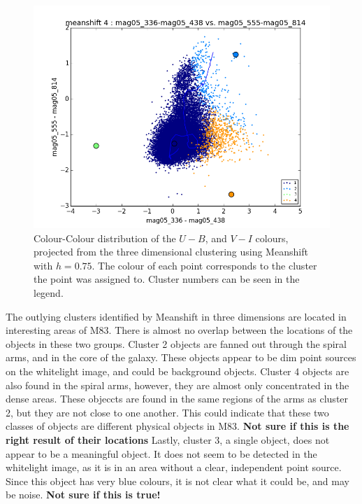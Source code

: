 \begin{figure}[H]
\centering
\includegraphics[width=\linewidth]{figs/broad/meanshift_base_color_4cl_mag05_336-mag05_438vsmag05_555-mag05_814}
\caption{Colour-Colour distribution of the $U - B$, and $V - I$ colours, projected from the three dimensional clustering using Meanshift with $h=0.75$. The colour of each point corresponds to the cluster the point was assigned to. Cluster numbers can be seen in the legend.}
\label{fig:BB3dMS4p}
\end{figure}

The outlying clusters identified by Meanshift in three dimensions are located in interesting areas of M83.
There is almost no overlap between the locations of the objects in these two groups. 
Cluster 2 objects are fanned out through the spiral arms, and in the core of the galaxy.
These objects appear to be dim point sources on the whitelight image, and could be background objects. 
Cluster 4 objects are also found in the spiral arms, however, they are almost only concentrated in the dense areas. 
These objeccts are found in the same regions of the arms as cluster 2, but they are not close to one another. 
This could indicate that these two classes of objects are different physical objects in M83. \textbf{Not sure if this is the right result of their locations}
Lastly, cluster 3, a single object, does not appear to be a meaningful object. It does not seem to be detected in the whitelight image, as it is in an area without a clear, independent point source.
Since this object has very blue colours, it is not clear what it could be, and may be noise. \textbf{Not sure if this is true!}


